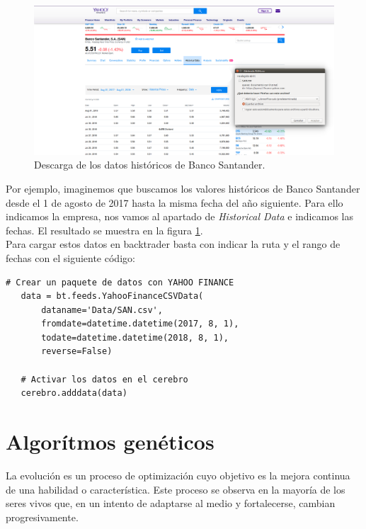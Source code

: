 \documentclass[12pt,a4paper]{article}
\begin{document}
		\begin{figure}[H]
			\centering
			\includegraphics[scale=1]{imagenes/yahoo_finance.png}
			\caption{Descarga de los datos hist\'oricos de Banco Santander.}
			\label{fig:yahoo_finance}
		\end{figure}
				
		Por ejemplo, imaginemos que buscamos los valores hist\'oricos de Banco Santander desde el 1 de agosto de 2017 hasta la misma fecha del a\~{n}o siguiente. Para ello indicamos la empresa, nos vamos al apartado de \textit{Historical Data} e indicamos las fechas. El resultado se muestra en la figura \ref{fig:yahoo_finance}.\\
		
		Para cargar estos datos en backtrader basta con indicar la ruta y el rango de fechas con el siguiente c\'odigo:

		\begin{lstlisting}[basicstyle=\tiny]
   # Crear un paquete de datos con YAHOO FINANCE
   data = bt.feeds.YahooFinanceCSVData(
	   dataname='Data/SAN.csv',
	   fromdate=datetime.datetime(2017, 8, 1),
	   todate=datetime.datetime(2018, 8, 1),
	   reverse=False)
   
   # Activar los datos en el cerebro
   cerebro.adddata(data)
		\end{lstlisting}		
		
	\newpage	
	\section{Algor\'itmos gen\'eticos}
		La evoluci\'on es un proceso de optimizaci\'on cuyo objetivo es la mejora continua de una habilidad o caracter\'istica. Este proceso se observa en la mayor\'ia de los seres vivos que, en un intento de adaptarse al medio y fortalecerse, cambian progresivamente.\\
		
\end{document}
